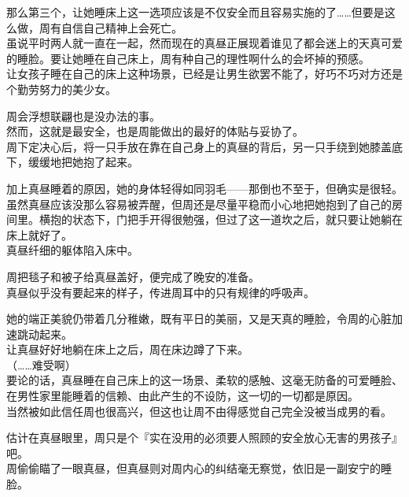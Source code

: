 那么第三个，让她睡床上这一选项应该是不仅安全而且容易实施的了……但要是这么做，周有自信自己精神上会死亡。\\

虽说平时两人就一直在一起，然而现在的真昼正展现着谁见了都会迷上的天真可爱的睡脸。要让她睡在自己床上，周有种自己的理性啊什么的会坏掉的预感。\\

让女孩子睡在自己的床上这种场景，已经是让男生欲罢不能了，好巧不巧对方还是个勤劳努力的美少女。

周会浮想联翩也是没办法的事。\\

然而，这就是最安全，也是周能做出的最好的体贴与妥协了。\\

周下定决心后，将一只手放在靠在自己身上的真昼的背后，另一只手绕到她膝盖底下，缓缓地把她抱了起来。

加上真昼睡着的原因，她的身体轻得如同羽毛——那倒也不至于，但确实是很轻。\\

虽然真昼应该没那么容易被弄醒，但周还是尽量平稳而小心地把她抱到了自己的房间里。横抱的状态下，门把手开得很勉强，但过了这一道坎之后，就只要让她躺在床上就好了。\\

真昼纤细的躯体陷入床中。

周把毯子和被子给真昼盖好，便完成了晚安的准备。\\

真昼似乎没有要起来的样子，传进周耳中的只有规律的呼吸声。

她的端正美貌仍带着几分稚嫩，既有平日的美丽，又是天真的睡脸，令周的心脏加速跳动起来。\\

让真昼好好地躺在床上之后，周在床边蹲了下来。\\

（……难受啊）\\

要论的话，真昼睡在自己床上的这一场景、柔软的感触、这毫无防备的可爱睡脸、在男性家里能睡着的信赖、由此产生的不设防，这一切的一切都是原因。\\

当然被如此信任周也很高兴，但这也让周不由得感觉自己完全没被当成男的看。

估计在真昼眼里，周只是个『实在没用的必须要人照顾的安全放心无害的男孩子』吧。\\

周偷偷瞄了一眼真昼，但真昼则对周内心的纠结毫无察觉，依旧是一副安宁的睡脸。\\

